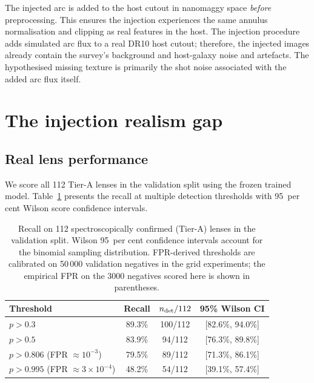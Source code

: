 \documentclass[fleqn,usenatbib]{rasti}
\begin{document}
The injected arc is added to the host cutout in nanomaggy space \emph{before} preprocessing.  This ensures the injection experiences the same annulus normalisation and clipping as real features in the host.  The injection procedure adds simulated arc flux to a real DR10 host cutout; therefore, the injected images already contain the survey's background and host-galaxy noise and artefacts.  The hypothesised missing texture is primarily the shot noise associated with the added arc flux itself.


\section{The injection realism gap}

\subsection{Real lens performance}

We score all 112 Tier-A lenses in the validation split using the frozen trained model.  Table~\ref{tab:tierA} presents the recall at multiple detection thresholds with 95~per cent Wilson score confidence intervals.

\begin{table}
\caption{Recall on 112 spectroscopically confirmed (Tier-A) lenses in the validation split.  Wilson 95~per cent confidence intervals account for the binomial sampling distribution.  FPR-derived thresholds are calibrated on 50\,000 validation negatives in the grid experiments; the empirical FPR on the 3000 negatives scored here is shown in parentheses.}
\label{tab:tierA}
\centering
\begin{tabular}{lccc}
\toprule
Threshold & Recall & $n_{\rm det}/112$ & 95\% Wilson CI \\
\midrule
$p > 0.3$ & 89.3\% & 100/112 & [82.6\%, 94.0\%] \\
$p > 0.5$ & 83.9\% & 94/112 & [76.3\%, 89.8\%] \\
$p > 0.806$ (FPR $\approx 10^{-3}$) & 79.5\% & 89/112 & [71.3\%, 86.1\%] \\
$p > 0.995$ (FPR $\approx 3 \times 10^{-4}$) & 48.2\% & 54/112 & [39.1\%, 57.4\%] \\
\bottomrule
\end{tabular}
\end{table}
\end{document}

